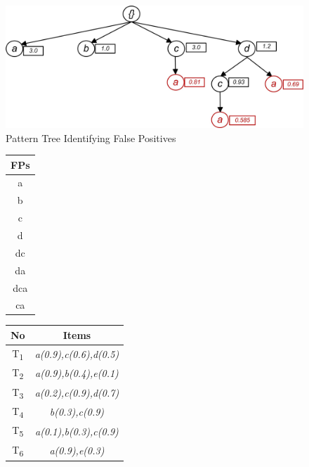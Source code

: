   \begin{figure}[]
        \centering
            \includegraphics[width=.45\textwidth]{images/frequent_tree_final}
        \caption{Pattern Tree Identifying False Positives}
        \label{figure:frequent_patterns_final}
  \end{figure}



\begin{figure}
\begin{minipage}{0.15\textwidth}
  \centering
  
	\begin{center}
	\begin{tabular}{ |c| } 
 	\hline
 		FPs\\ \hline\hline
 		a \\ \hline
 		b \\ \hline
 		c \\ \hline
 		d \\ \hline
 		dc \\ \hline
 		da \\ \hline
 		dca \\ \hline
 		ca \\ \hline
\end{tabular}
\end{center}  


\end{minipage}
\hfill
\begin{minipage}{0.30\textwidth}
  \centering
  
  \begin{center}
  \begin{tabular}{ |c|c| } 
  \hline
    No & Items \\ \hline\hline
    T\textsubscript{1} & \emph{a(0.9),c(0.6),d(0.5)}\\ \hline
    T\textsubscript{2}& \emph{a(0.9),b(0.4),e(0.1)}\\ \hline
    T\textsubscript{3}& \emph{a(0.2),c(0.9),d(0.7)}\\ \hline
    T\textsubscript{4}& \emph{b(0.3),c(0.9)}\\ \hline
    T\textsubscript{5}& \emph{a(0.1),b(0.3),c(0.9)} \\ \hline
    T\textsubscript{6} & \emph{a(0.9),e(0.3)
}\\ \hline
\end{tabular}
\end{center}  


\end{minipage}
\label{figure:frequent_patterns}
\end{figure}

